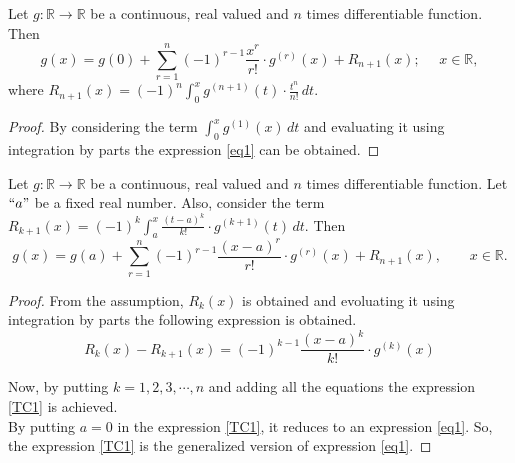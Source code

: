 \documentclass{beamer}
\begin{document}
\begin{frame}{}%

\begin{theorem}
 Let $g:\mathbb{R}\longrightarrow\mathbb{R}$ be a continuous, real valued and $n$ times differentiable function. Then
   \begin{equation}
g(x) = g(0) + \sum_{r=1}^n (-1)^{r-1} \frac{x^r}{r!} \cdot g^{(r)}(x) + R_{n+1}(x);~~~~~~x\in \mathbb{R},
\end{equation}\label{eq1}
where $\displaystyle{ R_{n+1}(x) =(-1)^n \int_0^x g^{(n+1)}(t) \cdot \frac{t^n}{n!} \, dt}$.
\end{theorem}

\begin{proof}
By considering the term $\displaystyle{ \int_0^x g^{(1)}(x) \, dt}$ and evaluating it using integration by parts the expression \eqref{eq1} can be obtained.
\end{proof}

\end{frame}

\begin{frame}%
\footnotesize
\begin{theorem}
Let $g:\mathbb{R}\longrightarrow\mathbb{R}$ be a continuous, real valued and $n$ times differentiable function. Let $``a"$ be a fixed real number. Also, consider the term\\
$\displaystyle{ R_{k+1}(x) = (-1)^k \int_a^x \frac{(t-a)^k}{k!} \cdot g^{(k+1)}(t) \, dt}$. Then
\begin{equation}
g(x) = g(a)+\sum_{r=1}^n (-1)^{r-1} \frac{(x-a)^r}{r!} \cdot g^{(r)}(x)+R_{n+1}(x),~~~~~~~~~ x \in \mathbb{R}.\label{TC1}
\end{equation}
\end{theorem}

\begin{proof}
From the assumption, $R_k(x)$ is obtained and evoluating it using integration by parts the following expression is obtained.
$$R_k(x) - R_{k+1}(x) = (-1)^{k-1} \frac{(x-a)^k}{k!} \cdot g^{(k)}(x)$$

Now, by putting $k = 1,2,3,\cdots,n$ and adding all the equations the expression \eqref{TC1} is achieved.\\
By putting $a = 0$ in the expression \eqref{TC1}, it reduces to an expression \eqref{eq1}. So, the expression \eqref{TC1} is the generalized version of expression \eqref{eq1}.

\end{proof}

\end{frame}
\end{document}
